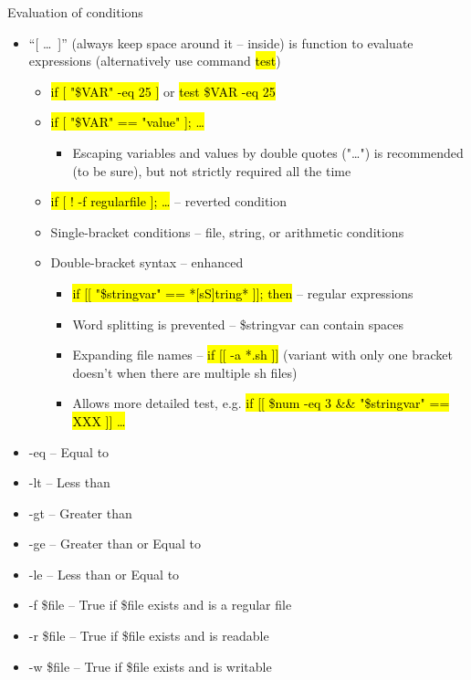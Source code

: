 \documentclass[compress, ucs, xelatex, 11pt, xcolor=svgnames,
  hyperref={
    bookmarks=true,
    unicode=true,
    colorlinks=true,
    pdftitle={Linux, command line and MetaCentrum},
    plainpages=false,
    pdfauthor={Vojtech Zeisek},
    pdfsubject={Course about use of Linux command line, writing shell scripts and using MetaCentrum of CESNET},
    pdfcreator={XeLaTeX},
    pdfkeywords={Linux, GNU, BASH, shell, command line, MetaCentrum},
    linkcolor=Red,
    anchorcolor=Blue,
    citecolor=Purple,
    filecolor=DodgerBlue,
    menucolor=DarkOrchid,
    urlcolor=DeepSkyBlue,
    pdftex},
  url={hyphens, lowtilde} %
  ]{beamer}
\renewcommand{\texttt}[1]{\hl{\ttfamily #1}}
\begin{document}
\begin{frame}[allowframebreaks]{Evaluation of conditions}
\begin{itemize}
  \item ``[ \ldots~]'' (always keep space around it -- inside) is function to evaluate expressions (alternatively use command \texttt{test})
  \begin{itemize}
    \item \texttt{if [ "\$VAR" -eq 25 ]} or \texttt{test \$VAR -eq 25}
    \item \texttt{if [ "\$VAR" == "value" ]; \ldots}
    \begin{itemize}
      \item Escaping variables and values by double quotes ("\ldots") is recommended (to be sure), but not strictly required all the time
    \end{itemize}
    \item \texttt{if [ ! -f regularfile ]; \ldots} -- reverted condition
    \item Single-bracket conditions -- file, string, or arithmetic conditions
    \item Double-bracket syntax -- enhanced
    \begin{itemize}
      \item \texttt{if [[ "\$stringvar" == *[sS]tring* ]]; then} -- regular expressions
      \item Word splitting is prevented -- \$stringvar can contain spaces
      \item Expanding file names -- \texttt{if [[ -a *.sh ]]} (variant with only one bracket doesn't when there are multiple sh files)
      \item Allows more detailed test, e.g. \texttt{if [[ \$num -eq 3 \&\& "\$stringvar" == XXX ]] \ldots}
    \end{itemize}
  \end{itemize}
  \item -eq -- Equal to
  \item -lt -- Less than
  \item -gt -- Greater than
  \item -ge -- Greater than or Equal to
  \item -le -- Less than or Equal to
  \item -f \$file -- True if \$file exists and is a regular file
  \item -r \$file -- True if \$file exists and is readable
  \item -w \$file -- True if \$file exists and is writable

\end{itemize}
\end{frame}
\end{document}
